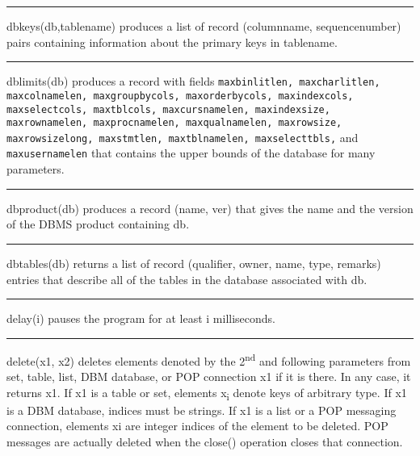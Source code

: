 \bigskip\hrule\vspace{0.1cm}

\noindent
{}dbkeys(db,tablename) produces a list of record
(columnname, sequencenumber) pairs containing information about the
primary keys in tablename.

\bigskip\hrule\vspace{0.1cm}

\noindent
dblimits(db) produces a record with fields \texttt{maxbinlitlen,
maxcharlitlen, maxcolnamelen, maxgroupbycols, maxorderbycols,
maxindexcols, maxselectcols, maxtblcols, maxcursnamelen, maxindexsize,
maxrownamelen, maxprocnamelen, maxqualnamelen, maxrowsize,
maxrowsizelong, maxstmtlen, maxtblnamelen, maxselecttbls,} and\texttt{
maxusernamelen} that contains the upper bounds of the database for many
parameters.

\bigskip\hrule\vspace{0.1cm}

\noindent
dbproduct(db) produces a record (name, ver) that gives the name and the
version of the DBMS product containing db.

\bigskip\hrule\vspace{0.1cm}

\noindent
dbtables(db) returns a list of record (qualifier, owner, name, type,
remarks) entries that describe all of the tables in the database
associated with db.

\bigskip\hrule\vspace{0.1cm}

\noindent
{}delay(i) pauses the program for at least i milliseconds.

\bigskip\hrule\vspace{0.1cm}

\noindent
{}delete(x1, x2) deletes elements denoted by the
2\textsuperscript{nd} and following parameters from set, table, list,
DBM database, or POP connection x1 if it is there. In any case, it
returns x1. If x1 is a table or set, elements x\textsubscript{i} denote
keys of arbitrary type. If x1 is a DBM database, indices must be
strings. If x1 is a list or a POP messaging connection, elements xi are
integer indices of the element to be deleted. POP messages are actually
deleted when the close() operation closes that connection.

